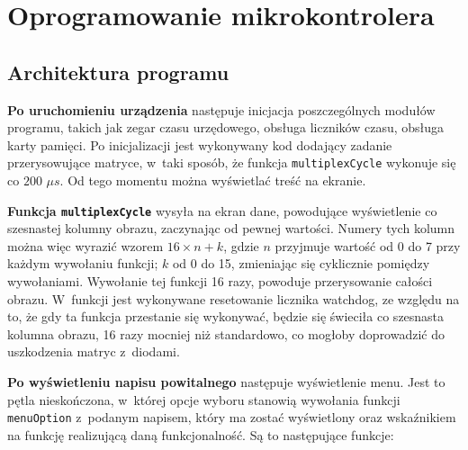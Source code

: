 \section{Oprogramowanie mikrokontrolera}

\subsection{Architektura programu}
\textbf{Po uruchomieniu urządzenia} następuje inicjacja poszczególnych modułów programu, takich jak zegar czasu urzędowego, obsługa liczników czasu, obsługa karty pamięci. Po inicjalizacji jest wykonywany kod dodający zadanie przerysowujące matryce, w~taki sposób, że funkcja \texttt{multiplexCycle} wykonuje się co $200$ $\mu s$. Od tego momentu można wyświetlać treść na ekranie.

\textbf{Funkcja \texttt{multiplexCycle}} wysyła na ekran dane, powodujące wyświetlenie co szesnastej kolumny obrazu, zaczynając od pewnej wartości. Numery tych kolumn można więc wyrazić wzorem $ 16 \times n + k $, gdzie $ n $ przyjmuje wartość od 0 do 7 przy każdym wywołaniu funkcji; $ k $ od 0 do 15, zmieniając się cyklicznie pomiędzy wywołaniami. Wywołanie tej funkcji 16 razy, powoduje przerysowanie całości obrazu. W~funkcji jest wykonywane resetowanie licznika watchdog, ze względu na to, że gdy ta funkcja przestanie się wykonywać, będzie się świeciła co szesnasta kolumna obrazu, 16 razy mocniej niż standardowo, co mogłoby doprowadzić do uszkodzenia matryc z~diodami.

\textbf{Po wyświetleniu napisu powitalnego} następuje wyświetlenie menu. Jest to pętla nieskończona, w~której opcje wyboru stanowią wywołania funkcji \texttt{menuOption} z~podanym napisem, który ma zostać wyświetlony oraz wskaźnikiem na funkcję realizującą daną funkcjonalność. Są to następujące funkcje:

